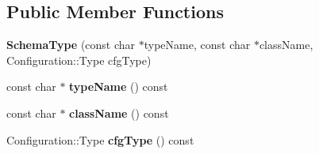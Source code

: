\subsection*{Public Member Functions}
\begin{DoxyCompactItemize}
\item 
\hypertarget{classCONFIG4CPP__NAMESPACE_1_1SchemaType_a253d19cc29fbc5c77cdacff617b155a4}{{\bfseries Schema\-Type} (const char $\ast$type\-Name, const char $\ast$class\-Name, Configuration\-::\-Type cfg\-Type)}\label{classCONFIG4CPP__NAMESPACE_1_1SchemaType_a253d19cc29fbc5c77cdacff617b155a4}

\item 
\hypertarget{classCONFIG4CPP__NAMESPACE_1_1SchemaType_acee6e27a98ec3b847e9b7ed52d7bdfc5}{const char $\ast$ {\bfseries type\-Name} () const }\label{classCONFIG4CPP__NAMESPACE_1_1SchemaType_acee6e27a98ec3b847e9b7ed52d7bdfc5}

\item 
\hypertarget{classCONFIG4CPP__NAMESPACE_1_1SchemaType_a9db17b690f59eae1b9e56d731db7350f}{const char $\ast$ {\bfseries class\-Name} () const }\label{classCONFIG4CPP__NAMESPACE_1_1SchemaType_a9db17b690f59eae1b9e56d731db7350f}

\item 
\hypertarget{classCONFIG4CPP__NAMESPACE_1_1SchemaType_a996bbaa17ce3ca52951b7a64977b1ac7}{Configuration\-::\-Type {\bfseries cfg\-Type} () const }\label{classCONFIG4CPP__NAMESPACE_1_1SchemaType_a996bbaa17ce3ca52951b7a64977b1ac7}

\end{DoxyCompactItemize}

